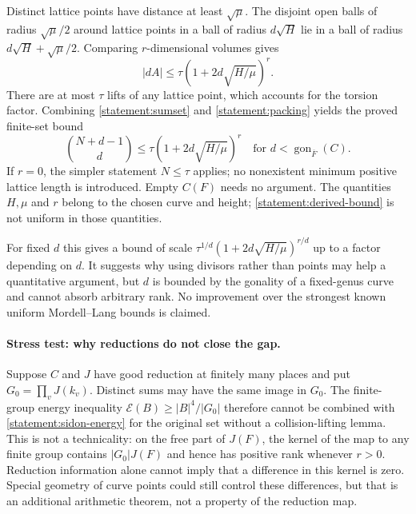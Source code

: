 \documentclass[11pt,a4paper]{article}
\numberwithin{equation}{section}
\begin{document}
Distinct lattice points have distance at least $\sqrt\mu$.
The disjoint open balls of radius $\sqrt\mu/2$ around lattice points in
a ball of radius $d\sqrt H$ lie in a ball of radius
$d\sqrt H+\sqrt\mu/2$. Comparing $r$-dimensional volumes gives
\begin{equation}\label{statement:packing}
 |dA|\le\tau\left(1+2d\sqrt{H/\mu}\right)^r.
\end{equation}
There are at most $\tau$ lifts of any lattice point, which accounts for
the torsion factor. Combining \eqref{statement:sumset} and
\eqref{statement:packing} yields the proved finite-set bound
\begin{equation}\label{statement:derived-bound}
 \boxed{\displaystyle
 \binom{N+d-1}{d}\le
 \tau\left(1+2d\sqrt{H/\mu}\right)^r
 \quad\text{for }d<\operatorname{gon}_{\overline F}(C).}
\end{equation}
If $r=0$, the simpler statement $N\le\tau$ applies; no nonexistent
minimum positive lattice length is introduced. Empty $C(F)$ needs no
argument. The quantities $H,\mu$ and $r$ belong to the chosen curve and
height; \eqref{statement:derived-bound} is not uniform in those quantities.

For fixed $d$ this gives a bound of scale
$\tau^{1/d}(1+2d\sqrt{H/\mu})^{r/d}$ up to a factor depending on $d$.
It suggests why using divisors rather than points may help a quantitative
argument, but $d$ is bounded by the gonality of a fixed-genus curve and
cannot absorb arbitrary rank. No improvement over the strongest known
uniform Mordell--Lang bounds is claimed.

\paragraph{Stress test: why reductions do not close the gap.}
Suppose $C$ and $J$ have good reduction at finitely many places and put
$G_0=\prod_v J(k_v)$. Distinct sums may have the same image in $G_0$.
The finite-group energy inequality
$\mathcal E(B)\ge |B|^4/|G_0|$ therefore cannot be combined with
\eqref{statement:sidon-energy} for the original set without a collision-lifting
lemma. This is not a technicality: on the free part of $J(F)$, the
kernel of the map to any finite group contains $|G_0|J(F)$ and hence has
positive rank whenever $r>0$. Reduction information alone cannot imply
that a difference in this kernel is zero. Special geometry of curve
points could still control these differences, but that is an additional
arithmetic theorem, not a property of the reduction map.
\end{document}
